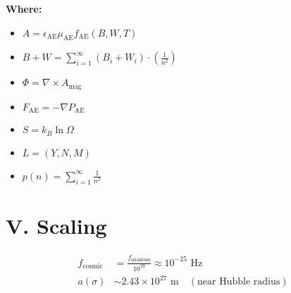 \textbf{Where:}
\begin{itemize}
    \item $A = \epsilon_{\text{AE}} \mu_{\text{AE}} f_{\text{AE}}(B,W,T)$
    \item $B + W = \sum_{i=1}^\infty (B_i + W_i) \cdot \left( \frac{1}{n^2} \right)$
    \item $\Phi = \nabla \times A_{\text{mag}}$
    \item $F_{\text{AE}} = -\nabla P_{\text{AE}}$
    \item $S = k_B \ln \Omega$
    \item $L = (Y, N, M)$
    \item $p(n) = \sum_{i=1}^\infty \frac{1}{n^2}$
\end{itemize}

\section*{V. Scaling}
\begin{align*}
f_{\text{cosmic}} &= \frac{f_{\text{quantum}}}{10^{39}} \approx 10^{-25} \text{ Hz} \\
a(\sigma) &\sim 2.43 \times 10^{27} \text{ m} \quad (\text{near Hubble radius})
\end{align*}
















